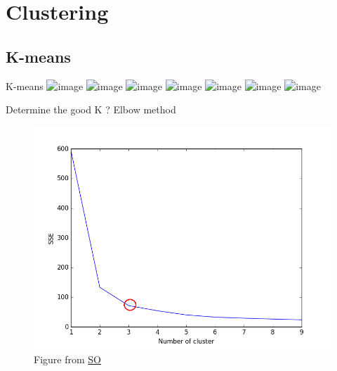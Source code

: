 \documentclass{irdbeamer}
\begin{document}

\section{Clustering}

\subsection{K-means}
\begin{frame}{K-means}
    \centering
    \includegraphics<1>[width=.7\textwidth]{./figs/kmeans01.png}%
    \includegraphics<2>[width=.7\textwidth]{./figs/kmeans02.png}%
    \includegraphics<3>[width=.7\textwidth]{./figs/kmeans03.png}%
    \includegraphics<4>[width=.7\textwidth]{./figs/kmeans04.png}%
    \includegraphics<5>[width=.7\textwidth]{./figs/kmeans05.png}%
    \includegraphics<6>[width=.7\textwidth]{./figs/kmeans06.png}%
    \includegraphics<7>[width=.7\textwidth]{./figs/kmeans07.png}%
\end{frame}

\begin{frame}{Determine the good K ? Elbow method}
    \vspace{-.5cm}
    \begin{figure}
    \centering
    \includegraphics[width=.5\textwidth]{./figs/elbow.png}
    \caption{\tiny Figure from \href{https://stackoverflow.com/questions/19197715/scikit-learn-k-means-elbow-criterion}{SO}}
    \end{figure}
\end{frame}
\end{document}
